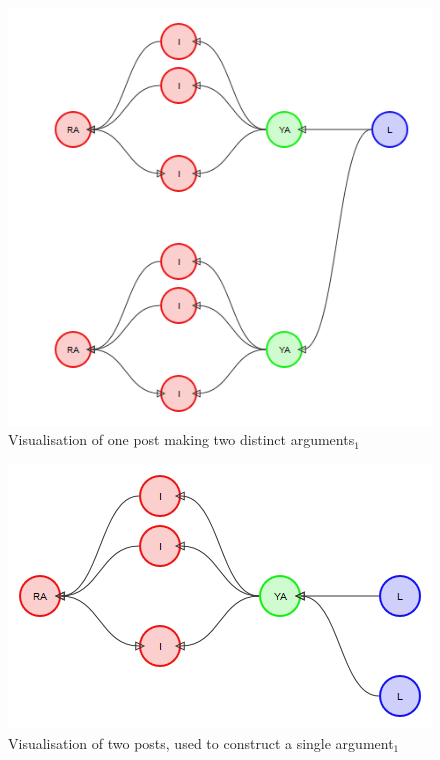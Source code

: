 \begin{figure}
\centering
\includegraphics[scale=0.5]{./figures/graphs/aswo-multiple-ya.png}
\caption{Visualisation of one post making two distinct arguments$_1$}
\label{figure:graphs:aswo-multiple-ya}
\end{figure}


\begin{figure}
\centering
\includegraphics[scale=0.5]{./figures/graphs/aswo-single-ya.png}
\caption{Visualisation of two posts, used to construct a single argument$_1$}
\label{figure:graphs:aswo-single-ya}
\end{figure}


